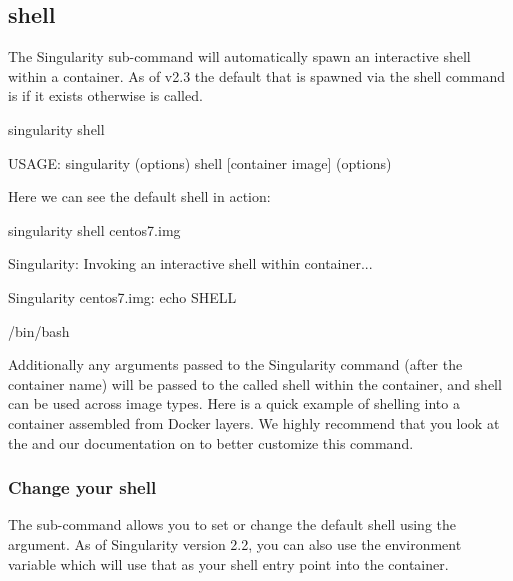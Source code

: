 \documentclass[letterpaper,10pt,english]{sphinxmanual}
\begin{document}
\subsection{shell}
\label{\detokenize{appendix:shell}}\label{\detokenize{appendix:shell-command}}
The  Singularity sub-command will automatically spawn an interactive
shell within a container. As of v2.3 the default that is spawned via the
shell command is  if it exists otherwise  is called.

%
\begin{sphinxVerbatim}[commandchars=\\\{\}]
\PYGZdl{} singularity shell

USAGE: singularity (options) shell [container image] (options)
\end{sphinxVerbatim}

Here we can see the default shell in action:

%
\begin{sphinxVerbatim}[commandchars=\\\{\}]
\PYGZdl{} singularity shell centos7.img

Singularity: Invoking an interactive shell within container...


Singularity centos7.img:\PYGZti{}\PYGZgt{} echo \PYGZdl{}SHELL

/bin/bash
\end{sphinxVerbatim}

Additionally any arguments passed to the Singularity command (after the
container name) will be passed to the called shell within the container,
and shell can be used across image types. Here is a quick example of
shelling into a container assembled from Docker layers. We highly
recommend that you look at the  and our documentation on {\hyperref[\detokenize{appendix:singularity-action-flags}]{}} to
better customize this command.


\subsubsection{Change your shell}
\label{\detokenize{appendix:change-your-shell}}
The  sub-command allows you to set or change the default shell using the 
argument. As of Singularity version 2.2, you can also use the
environment variable  which will use that as your shell entry point into
the container.
\end{document}
